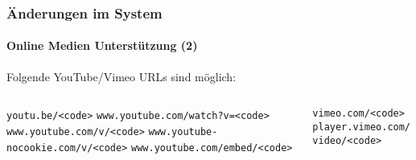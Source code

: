 
\begin{frame}[fragile]
	\frametitle{Änderungen im System}
	\framesubtitle{Online Medien Unterstützung (2)}

	Folgende YouTube/Vimeo URLs sind möglich:
	\vspace{0.4cm}

	\begin{columns}[T]
		\begin{column}{.52\textwidth}
			\smaller
				\tabto{0.2cm}\texttt{youtu.be/<code>}\newline
				\tabto{0.2cm}\texttt{www.youtube.com/watch?v=<code>}\newline
				\tabto{0.2cm}\texttt{www.youtube.com/v/<code>}\newline
				\tabto{0.2cm}\texttt{www.youtube-nocookie.com/v/<code>}\newline
				\tabto{0.2cm}\texttt{www.youtube.com/embed/<code>}\newline
		\end{column}
		\begin{column}{.48\textwidth}
			\vspace{-0.25cm}\smaller
				\texttt{vimeo.com/<code>}\newline
				\texttt{player.vimeo.com/video/<code>}\newline
		\end{column}
	\end{columns}

\end{frame}


